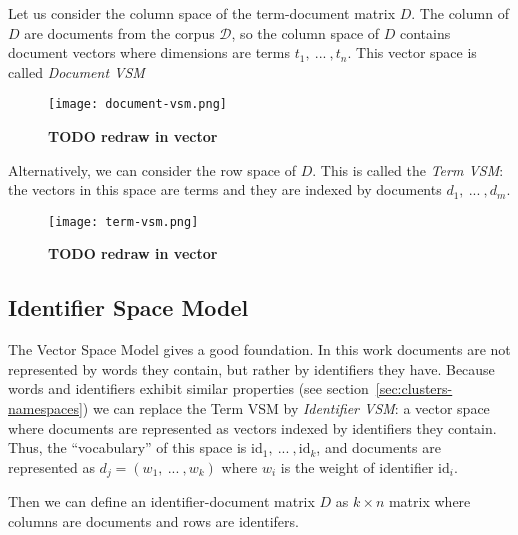 Let us consider the column space of the term-document matrix $D$.
The column of $D$ are documents from the corpus $\mathcal D$,
so the column space of $D$ contains document vectors where
dimensions are terms $t_1, \ ... \ , t_n$. This vector space is
called \emph{Document VSM}


\begin{figure}[h]
\centering\texttt{[image: document-vsm.png]}
\caption{\textbf{TODO redraw in vector}}
\label{fig:document-vsm}
\end{figure}


Alternatively, we can consider the row space of $D$. This is
called the \emph{Term VSM}: the vectors in this space are terms
and they are indexed by documents $d_1, \ ... \ , d_m$.


\begin{figure}[h]
\centering\texttt{[image: term-vsm.png]}
\caption{\textbf{TODO redraw in vector}}
\label{fig:term-vsm}
\end{figure}





\subsection{Identifier Space Model} \label{sec:ism}

The Vector Space Model gives a good foundation. In this work documents
are not represented by words they contain, but rather by identifiers they
have. Because  words and identifiers exhibit similar properties
(see section~\ref{sec:clusters-namespaces}) we can replace the
Term VSM by \emph{Identifier VSM}: a vector space where documents are represented as
vectors indexed by identifiers they contain.
Thus, the ``vocabulary'' of this space is $\text{id}_1, \ ... \ , \text{id}_k$, and
documents are represented as $d_j = (w_1, \ ... \ , w_k)$ where
$w_i$ is the weight of identifier $\text{id}_i$.

Then we can define an identifier-document matrix $D$ as $k \times n$
matrix where columns are documents and rows are identifers.

